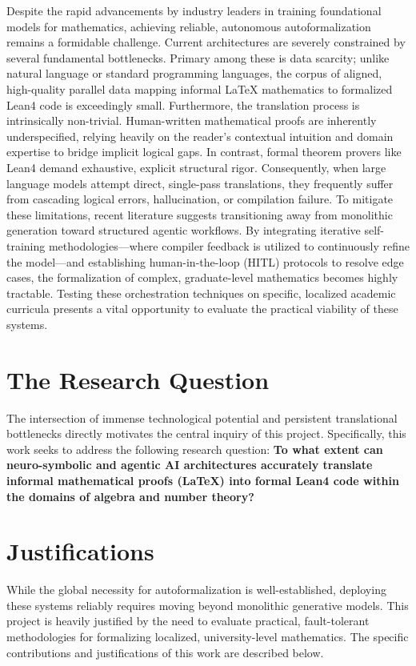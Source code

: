 Despite the rapid advancements by industry leaders in training foundational models for mathematics, achieving reliable, autonomous autoformalization remains a formidable challenge. Current architectures are severely constrained by several fundamental bottlenecks. Primary among these is data scarcity; unlike natural language or standard programming languages, the corpus of aligned, high-quality parallel data mapping informal LaTeX mathematics to formalized Lean4 code is exceedingly small. Furthermore, the translation process is intrinsically non-trivial. Human-written mathematical proofs are inherently underspecified, relying heavily on the reader's contextual intuition and domain expertise to bridge implicit logical gaps. In contrast, formal theorem provers like Lean4 demand exhaustive, explicit structural rigor. Consequently, when large language models attempt direct, single-pass translations, they frequently suffer from cascading logical errors, hallucination, or compilation failure. To mitigate these limitations, recent literature suggests transitioning away from monolithic generation toward structured agentic workflows. By integrating iterative self-training methodologies—where compiler feedback is utilized to continuously refine the model—and establishing human-in-the-loop (HITL) protocols to resolve edge cases, the formalization of complex, graduate-level mathematics becomes highly tractable. Testing these orchestration techniques on specific, localized academic curricula presents a vital opportunity to evaluate the practical viability of these systems.

\section{The Research Question}

The intersection of immense technological potential and persistent translational bottlenecks directly motivates the central inquiry of this project. Specifically, this work seeks to address the following research question: \textbf{To what extent can neuro-symbolic and agentic AI architectures accurately translate informal mathematical proofs (LaTeX) into formal Lean4 code within the domains of algebra and number theory?}

\section{Justifications}

While the global necessity for autoformalization is well-established, deploying these systems reliably requires moving beyond monolithic generative models. This project is heavily justified by the need to evaluate practical, fault-tolerant methodologies for formalizing localized, university-level mathematics. The specific contributions and justifications of this work are described below.

